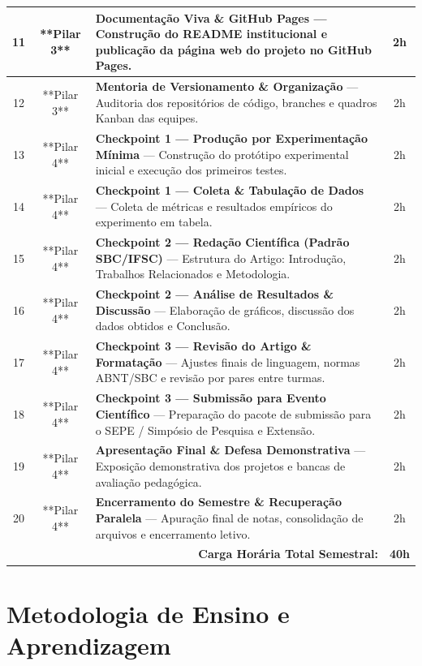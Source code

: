 \documentclass[12pt,a4paper]{article}
\begin{document}
\begin{table}[H]
\begin{tabularx}{\textwidth}{|c|c|X|c|}
\rowcolor{cinzaLinha}
11 & **Pilar 3** & \textbf{Documentação Viva \& GitHub Pages} — Construção do README institucional e publicação da página web do projeto no GitHub Pages. & 2h \\ \hline
12 & **Pilar 3** & \textbf{Mentoria de Versionamento \& Organização} — Auditoria dos repositórios de código, branches e quadros Kanban das equipes. & 2h \\ \hline
\rowcolor{cinzaLinha}
13 & **Pilar 4** & \textbf{Checkpoint 1 — Produção por Experimentação Mínima} — Construção do protótipo experimental inicial e execução dos primeiros testes. & 2h \\ \hline
14 & **Pilar 4** & \textbf{Checkpoint 1 — Coleta \& Tabulação de Dados} — Coleta de métricas e resultados empíricos do experimento em tabela. & 2h \\ \hline
\rowcolor{cinzaLinha}
15 & **Pilar 4** & \textbf{Checkpoint 2 — Redação Científica (Padrão SBC/IFSC)} — Estrutura do Artigo: Introdução, Trabalhos Relacionados e Metodologia. & 2h \\ \hline
16 & **Pilar 4** & \textbf{Checkpoint 2 — Análise de Resultados \& Discussão} — Elaboração de gráficos, discussão dos dados obtidos e Conclusão. & 2h \\ \hline
\rowcolor{cinzaLinha}
17 & **Pilar 4** & \textbf{Checkpoint 3 — Revisão do Artigo \& Formatação} — Ajustes finais de linguagem, normas ABNT/SBC e revisão por pares entre turmas. & 2h \\ \hline
18 & **Pilar 4** & \textbf{Checkpoint 3 — Submissão para Evento Científico} — Preparação do pacote de submissão para o SEPE / Simpósio de Pesquisa e Extensão. & 2h \\ \hline
\rowcolor{cinzaLinha}
19 & **Pilar 4** & \textbf{Apresentação Final \& Defesa Demonstrativa} — Exposição demonstrativa dos projetos e bancas de avaliação pedagógica. & 2h \\ \hline
20 & **Pilar 4** & \textbf{Encerramento do Semestre \& Recuperação Paralela} — Apuração final de notas, consolidação de arquivos e encerramento letivo. & 2h \\ \hline
\multicolumn{3}{|r|}{\textbf{Carga Horária Total Semestral:}} & \textbf{40h} \\ \hline
\end{tabularx}
\end{table}

\section{Metodologia de Ensino e Aprendizagem}
\end{document}

